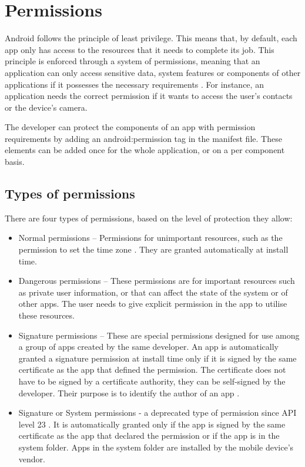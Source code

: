     \section{Permissions}
        \label{sec:permissions}
        
    Android follows the principle of least privilege. This means that, by default, each app only has access to the resources that it needs to complete its job. This principle is enforced through a system of permissions, meaning that an application can only access sensitive data, system features or components of other applications if it possesses the necessary requirements \cite{permissions_guide}. For instance, an application needs the correct permission if it wants to access the user’s contacts or the device’s camera.
    
    The developer can protect the components of an app with permission requirements by adding an android:permission tag in the manifest file. These elements can be added once for the whole application, or on a per component basis.
    
    \subsection{Types of permissions}
        \label{subsec:types_of_permissions}
        
    There are four types of permissions, based on the level of protection they allow:
    
    \begin{itemize}
        \item Normal permissions – Permissions for unimportant resources, such as the permission to set the time zone \cite{permissions_guide}. They are granted automatically at install time.
        \item Dangerous permissions – These permissions are for important resources such as private user information, or that can affect the state of the system or of other apps. The user needs to give explicit permission in the app to utilise these resources.
        \item Signature permissions – These are special permissions designed for use among a group of apps created by the same developer. An app is automatically granted a signature permission at install time only if it is signed by the same certificate as the app that defined the permission. The certificate does not have to be signed by a certificate authority, they can be self-signed by the developer. Their purpose is to identify the author of an app \cite{define_custom_permission}.
        \item Signature or System permissions - a deprecated type of permission since API level 23 \cite{manifest_permissions_element}. It is automatically granted only if the app is signed by the same certificate as the app that declared the permission or if the app is in the system folder. Apps in the system folder are installed by the mobile device’s vendor.
    \end{itemize}
    
